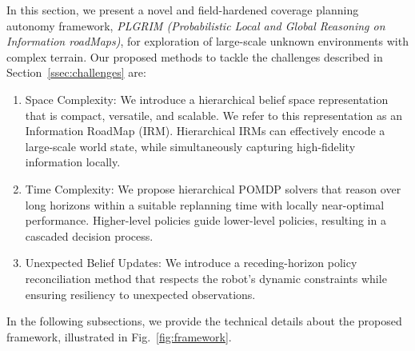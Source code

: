 \documentclass[letterpaper]{article} %
\newcommand{\phdone}[1]{} %
\begin{document}
\phdone{Framework Overview}
In this section, we present a novel and field-hardened coverage planning autonomy framework, \textit{PLGRIM (Probabilistic Local and Global Reasoning on Information roadMaps)}, for exploration of large-scale unknown environments with complex terrain.
Our proposed methods to tackle the challenges described in Section~\ref{ssec:challenges} are:
%
\vspace{-4pt}
\begin{enumerate}[label={\arabic*)}]
  \itemsep0em 
  \setlength{\itemsep}{0pt}
  \setlength{\parskip}{0pt}
  \item \label{en:idea1} Space Complexity:
  We introduce a hierarchical belief space representation that is compact, versatile, and scalable.
  We refer to this representation as an Information RoadMap (IRM).
  Hierarchical IRMs can effectively encode a large-scale world state, while simultaneously capturing high-fidelity information locally.
  \item \label{en:idea2} Time Complexity:
  We propose hierarchical POMDP solvers that reason over long horizons within a suitable replanning time with locally near-optimal performance. Higher-level policies guide lower-level policies, resulting in a cascaded decision process.
  \item \label{en:idea4} Unexpected Belief Updates:
  We introduce a receding-horizon policy reconciliation method that respects the robot's dynamic constraints while ensuring resiliency to unexpected observations.
\end{enumerate}
\vspace{-1pt}


\noindent
In the following subsections, we provide the technical details about the proposed framework, illustrated in Fig.~\ref{fig:framework}. 
\end{document}
